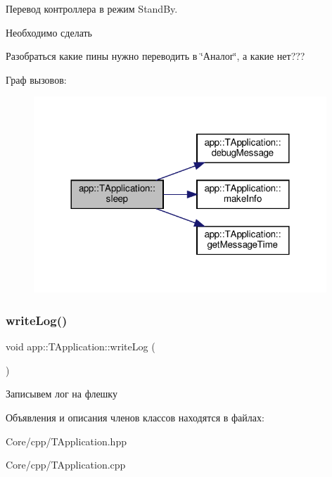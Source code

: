 Перевод контроллера в режим Stand\+By. 



 \begin{DoxyRefDesc}{Необходимо сделать}
\item[\hyperlink{todo__todo000003}{Необходимо сделать}]Разобраться какие пины нужно переводить в \char`\"{}Аналог\char`\"{}, а какие нет??? \end{DoxyRefDesc}
Граф вызовов\+:\nopagebreak
\begin{figure}[H]
\begin{center}
\leavevmode
\includegraphics[width=312pt]{classapp_1_1_t_application_ab44dd5aa2afe1d66b2588e908bfad4d0_cgraph}
\end{center}
\end{figure}
\mbox{\label{classapp_1_1_t_application_a8c4bf0b62709ad4abd9c9027f1f58106}} 
\subsubsection{\texorpdfstring{write\+Log()}{writeLog()}}
{\footnotesize\ttfamily void app\+::\+T\+Application\+::write\+Log (\begin{DoxyParamCaption}{ }\end{DoxyParamCaption})}



Записывем лог на флешку 



 

Объявления и описания членов классов находятся в файлах\+:\begin{DoxyCompactItemize}
\item 
Core/cpp/T\+Application.\+hpp\item 
Core/cpp/T\+Application.\+cpp\end{DoxyCompactItemize}
